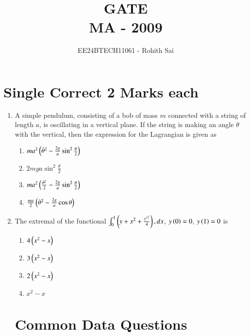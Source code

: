 \documentclass[journal]{IEEEtran}
\begin{document}

\vspace{3cm}

\title{GATE\\MA - 2009}
\author{EE24BTECH11061 - Rohith Sai}
\maketitle

\renewcommand{\thefigure}{\theenumi}
\renewcommand{\thetable}{\theenumi}

\section*{Single Correct 2 Marks each}
\begin{enumerate}
\item A simple pendulum, consisting of a bob of mass $m$ connected with a string of length $a$, is oscillating in a vertical plane. If the string is making an angle $\theta$ with the vertical, then the expression for the Lagrangian is given as
\begin{multicols}{2}
    \begin{enumerate}
        \item $ma^2\left(\dot{\theta}^2 - \frac{2g}{a} \sin^2{\frac{\theta}{2}}\right)$
        \item $2mga \sin^2{\frac{\theta}{2}}$
        \item $ma^2\left(\frac{\dot{\theta}^2}{2} - \frac{2g}{a} \sin^2{\frac{\theta}{2}}\right)$
        \item $\frac{ma}{2}\left(\dot{\theta}^2 - \frac{2g}{a} \cos{\theta}\right)$
    \end{enumerate}
\end{multicols}

\item The extremal of the functional $\int_0^1 \left(y+x^2 + \frac{y^{\prime 2}}{4}\right), dx$, $y\left(0\right) = 0$, $y\left(1\right) = 0$ is
\begin{multicols}{2}
    \begin{enumerate}
        \item $4\left(x^2-x\right)$
        \item $3\left(x^2-x\right)$
        \item $2\left(x^2-x\right)$
        \item $x^2-x$
    \end{enumerate}
\end{multicols}

\section*{Common Data Questions}

\end{enumerate}
\end{document}
